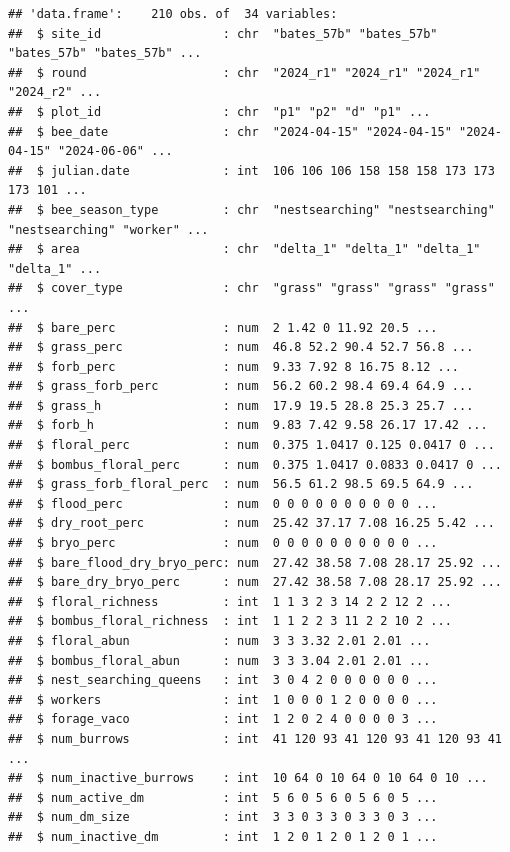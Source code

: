 \documentclass[
]{article}
\begin{document}
\begin{verbatim}
## 'data.frame':    210 obs. of  34 variables:
##  $ site_id                 : chr  "bates_57b" "bates_57b" "bates_57b" "bates_57b" ...
##  $ round                   : chr  "2024_r1" "2024_r1" "2024_r1" "2024_r2" ...
##  $ plot_id                 : chr  "p1" "p2" "d" "p1" ...
##  $ bee_date                : chr  "2024-04-15" "2024-04-15" "2024-04-15" "2024-06-06" ...
##  $ julian.date             : int  106 106 106 158 158 158 173 173 173 101 ...
##  $ bee_season_type         : chr  "nestsearching" "nestsearching" "nestsearching" "worker" ...
##  $ area                    : chr  "delta_1" "delta_1" "delta_1" "delta_1" ...
##  $ cover_type              : chr  "grass" "grass" "grass" "grass" ...
##  $ bare_perc               : num  2 1.42 0 11.92 20.5 ...
##  $ grass_perc              : num  46.8 52.2 90.4 52.7 56.8 ...
##  $ forb_perc               : num  9.33 7.92 8 16.75 8.12 ...
##  $ grass_forb_perc         : num  56.2 60.2 98.4 69.4 64.9 ...
##  $ grass_h                 : num  17.9 19.5 28.8 25.3 25.7 ...
##  $ forb_h                  : num  9.83 7.42 9.58 26.17 17.42 ...
##  $ floral_perc             : num  0.375 1.0417 0.125 0.0417 0 ...
##  $ bombus_floral_perc      : num  0.375 1.0417 0.0833 0.0417 0 ...
##  $ grass_forb_floral_perc  : num  56.5 61.2 98.5 69.5 64.9 ...
##  $ flood_perc              : num  0 0 0 0 0 0 0 0 0 0 ...
##  $ dry_root_perc           : num  25.42 37.17 7.08 16.25 5.42 ...
##  $ bryo_perc               : num  0 0 0 0 0 0 0 0 0 0 ...
##  $ bare_flood_dry_bryo_perc: num  27.42 38.58 7.08 28.17 25.92 ...
##  $ bare_dry_bryo_perc      : num  27.42 38.58 7.08 28.17 25.92 ...
##  $ floral_richness         : int  1 1 3 2 3 14 2 2 12 2 ...
##  $ bombus_floral_richness  : int  1 1 2 2 3 11 2 2 10 2 ...
##  $ floral_abun             : num  3 3 3.32 2.01 2.01 ...
##  $ bombus_floral_abun      : num  3 3 3.04 2.01 2.01 ...
##  $ nest_searching_queens   : int  3 0 4 2 0 0 0 0 0 0 ...
##  $ workers                 : int  1 0 0 0 1 2 0 0 0 0 ...
##  $ forage_vaco             : int  1 2 0 2 4 0 0 0 0 3 ...
##  $ num_burrows             : int  41 120 93 41 120 93 41 120 93 41 ...
##  $ num_inactive_burrows    : int  10 64 0 10 64 0 10 64 0 10 ...
##  $ num_active_dm           : int  5 6 0 5 6 0 5 6 0 5 ...
##  $ num_dm_size             : int  3 3 0 3 3 0 3 3 0 3 ...
##  $ num_inactive_dm         : int  1 2 0 1 2 0 1 2 0 1 ...
\end{verbatim}
\end{document}
